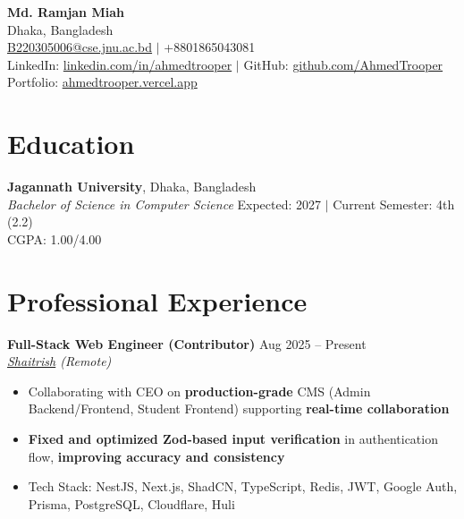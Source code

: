 \documentclass[10pt,a4paper]{article}
\begin{document}
\begin{center}
    {\LARGE \textbf{Md. Ramjan Miah}} \\[3pt]
    Dhaka, Bangladesh \\[2pt]
    \href{mailto:B220305006@cse.jnu.ac.bd}{B220305006@cse.jnu.ac.bd} $|$ +8801865043081 \\[2pt]
    LinkedIn: \href{https://linkedin.com/in/ahmedtrooper}{linkedin.com/in/ahmedtrooper} $|$ 
    GitHub: \href{https://github.com/AhmedTrooper}{github.com/AhmedTrooper} \\[2pt]
    Portfolio: \href{https://ahmedtrooper.vercel.app}{ahmedtrooper.vercel.app}
\end{center}

\vspace{-4pt}

\section{Education}
\textbf{Jagannath University}, Dhaka, Bangladesh \\
\textit{Bachelor of Science in Computer Science} \hfill Expected: 2027 $|$ Current Semester: 4th (2.2) \\
CGPA: 1.00/4.00

\section{Professional Experience}
\textbf{Full-Stack Web Engineer (Contributor)} \hfill Aug 2025 -- Present \\
\textit{\href{https://www.shaitrish.com/}{Shaitrish} (Remote)} \\[-6pt]
\begin{itemize}[leftmargin=12pt, itemsep=0pt, topsep=2pt]
    \item Collaborating with CEO on \textbf{production-grade} CMS (Admin Backend/Frontend, Student Frontend) supporting \textbf{real-time collaboration}
    \item \textbf{Fixed and optimized Zod-based input verification} in authentication flow, \textbf{improving accuracy and consistency}
    \item Tech Stack: NestJS, Next.js, ShadCN, TypeScript, Redis, JWT, Google Auth, Prisma, PostgreSQL, Cloudflare, Huli
\end{itemize}

\end{document}
